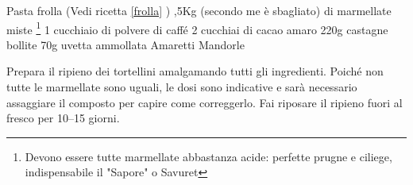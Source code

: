 \begin{ingreds}
	Pasta frolla (Vedi ricetta \ref{frolla} )
	,5Kg (secondo me è sbagliato) di marmellate miste  \footnote{Devono essere tutte marmellate abbastanza acide: perfette prugne e ciliege, indispensabile il "Sapore" o Savuret}
	1 cucchiaio di polvere di caffé 
	2 cucchiai di cacao amaro 
	220g castagne bollite 
	70g uvetta ammollata 
	Amaretti 
	Mandorle 



\end{ingreds}

\begin{method}
Prepara il ripieno dei tortellini amalgamando tutti gli ingredienti. Poiché non tutte le marmellate sono uguali, le dosi sono indicative e sarà necessario assaggiare il composto per capire come correggerlo. Fai riposare il ripieno fuori al fresco per 10--15 giorni.


\end{method}




